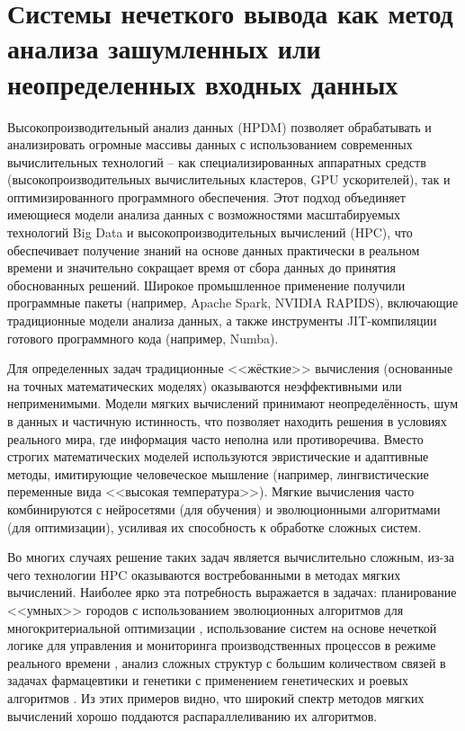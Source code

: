 \chapter{Системы нечеткого вывода как метод анализа зашумленных или неопределенных входных данных}\label{ch:ch1}


Высокопроизводительный анализ данных (HPDM) позволяет обрабатывать и анализировать огромные массивы данных с использованием современных вычислительных технологий – как специализированных аппаратных средств (высокопроизводительных вычислительных кластеров, GPU ускорителей), так и оптимизированного программного обеспечения. Этот подход объединяет имеющиеся модели анализа данных с возможностями масштабируемых технологий Big Data и высокопроизводительных вычислений (HPC), что обеспечивает получение знаний на основе данных практически в реальном времени и значительно сокращает время от сбора данных до принятия обоснованных решений. Широкое промышленное применение получили программные пакеты (например, Apache Spark, NVIDIA RAPIDS), включающие традиционные модели анализа данных, а также инструменты JIT-компиляции готового программного кода (например, Numba).

Для определенных задач традиционные <<жёсткие>> вычисления (основанные на точных математических моделях) оказываются неэффективными или неприменимыми. Модели мягких вычислений принимают неопределённость, шум в данных и частичную истинность, что позволяет находить решения в условиях реального мира, где информация часто неполна или противоречива. Вместо строгих математических моделей используются эвристические и адаптивные методы, имитирующие человеческое мышление (например, лингвистические переменные вида <<высокая температура>>). Мягкие вычисления часто комбинируются с нейросетями (для обучения) и эволюционными алгоритмами (для оптимизации), усиливая их способность к обработке сложных систем.

Во многих случаях решение таких задач является вычислительно сложным, из-за чего технологии HPC оказываются востребованными в методах мягких вычислений. Наиболее ярко эта потребность выражается в задачах: планирование <<умных>> городов с использованием эволюционных алгоритмов для многокритериальной оптимизации \cite{Toutouh2019, Gora2015}, использование систем на основе нечеткой логике для управления и мониторинга производственных процессов в режиме реального времени \cite{Zhang2023, Vivas2022}, анализ сложных структур с большим количеством связей в задачах фармацевтики и генетики с применением генетических и роевых алгоритмов \cite{Liu2016, Easwaran2024}. Из этих примеров видно, что широкий спектр методов мягких вычислений хорошо поддаются распараллеливанию их алгоритмов.

